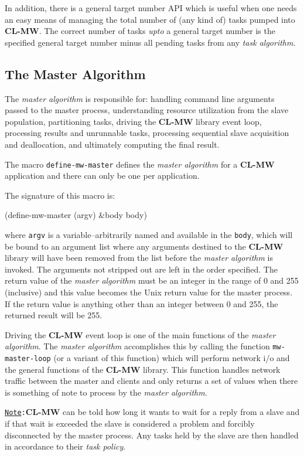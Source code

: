 \documentclass[titlepage,12pt]{book}
\newcommand{\xsmall}{\latexhtml{\small}{}}
\newcommand{\xnormalsize}{\latexhtml{\normalsize}{}}
\newcommand{\clmw}{\xsmall\textbf{CL-MW}\xnormalsize\xspace}
\newcommand{\ma}{\textit{master algorithm}\xspace}
\newcommand{\ta}{\textit{task algorithm}\xspace}
\newcommand{\tp}{\textit{task policy}\xspace}
\newcommand{\func}[1]{\xsmall\mbox{\uppercase{\texttt{#1}}}\xnormalsize\xspace}
\newcommand{\macro}[1]{\xsmall\mbox{\uppercase{\texttt{#1}}}\xnormalsize\xspace}
\newcommand{\var}[1]{\texttt{#1}\xspace}
\newcommand{\Note}{\texttt{\underline{Note}:}\xspace}
\begin{document}
In addition, there is a general target number API which is useful when
one needs an easy means of managing the total number of (any kind of)
tasks pumped into \clmw. The correct number of tasks \textit{upto}
a general target number is the specified general target number minus
all pending tasks from any \ta.

\subsection{The Master Algorithm}

The \ma is responsible for: handling command line arguments passed
to the master process, understanding resource utilization from the
slave population, partitioning tasks, driving the \clmw library event
loop, processing results and unrunnable tasks, processing sequential
slave acquisition and deallocation, and ultimately computing the
final result.

The macro \macro{define-mw-master} defines the \ma for a \clmw
application and there can only be one per application.

The signature of this macro is:

\begin{barelisp}
(define-mw-master (argv) &body body)
\end{barelisp}

where \var{argv} is a variable--arbitrarily named and available
in the \var{body}, which will be bound to an argument list where
any arguments destined to the \clmw library will have been removed
from the list before the \ma is invoked. The arguments not stripped
out are left in the order specified.  The return value of the \ma
must be an integer in the range of 0 and 255 (inclusive) and this
value becomes the Unix return value for the master process. If the
return value is anything other than an integer between 0 and 255,
the returned result will be 255.

Driving the \clmw event loop is one of the main functions of
the \ma. The \ma accomplishes this by calling the function
\func{mw-master-loop} (or a variant of this function) which
will perform network i/o and the general functions of the \clmw
library. This function handles network traffic between the master and
clients and only returns a set of values when there is something of
note to process by the \ma.

\Note \clmw can be told how long it wants to wait for a reply
from a slave and if that wait is exceeded the slave is considered a
problem and forcibly disconnected by the master process. Any tasks
held by the slave are then handled in accordance to their \tp.
\end{document}
